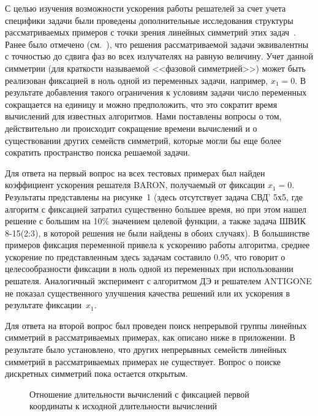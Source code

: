 С целью изучения возможности ускорения работы решателей за счет учета специфики задачи были проведены дополнительные исследования
структуры рассматриваемых примеров с точки зрения линейных симметрий этих задач~\cite{yurkov:symmetry}. Ранее было отмечено (см.~\cite{tyu:daor}), что решения рассматриваемой задачи эквивалентны с точностью до сдвига фаз во всех излучателях на равную величину.
Учет данной симметрии (для краткости называемой <<фазовой симметрией>>) может быть реализован фиксацией в ноль одной из переменных задачи, например, $x_1=0$. В результате добавления такого ограничения к условиям задачи число переменных сокращается на единицу и можно предположить, что это сократит время вычислений для известных алгоритмов. Нами поставлены вопросы о том, действительно ли происходит сокращение времени вычислений и о существовании других семейств симметрий, которые могли бы еще более сократить пространство поиска решаемой задачи.

Для ответа на первый вопрос на всех тестовых примерах был найден коэффициент ускорения решателя BARON, получаемый от фиксации $x_1=0$. Результаты представлены на рисунке~1 (здесь отсутствует задача СВД' 5х5, где алгоритм с фиксацией затратил существенно большее время, но при этом нашел решение с большим на 10\% значением целевой функции, а также задача ШВИК 8-15(2:3), в которой решения не были найдены в обоих случаях).     В большинстве примеров фиксация переменной привела к ускорению работы алгоритма, среднее ускорение по представленным здесь задачам составило 0.95, что говорит о целесообразности фиксации в ноль одной из переменных при использовании решателя. Аналогичный эксперимент с алгоритмом ДЭ и решателем ANTIGONE не показал существенного улучшения качества решений или их ускорения в результате фиксации~$x_1$.

Для ответа на второй вопрос был проведен поиск непрерывой группы линейных симметрий в рассматриваемых примерах, как описано ниже в приложении. В результате было установлено, что других непрерывных семейств линейных симметрий в рассматриваемых примерах не существует. Вопрос о поиске дискретных симметрий пока остается открытым.

\begin{figure}
\caption{Отношение длительности вычислений с фиксацией первой координаты к исходной длительности вычислений}
\label{ris:ring}
\end{figure}

